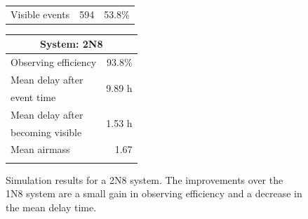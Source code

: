 \begin{colsection}
\begin{colsection}
\begin{figure}[p]
\begin{center}
\begin{minipage}[t]{0.45\textwidth}
\begin{tabular}{lrr}
                \midrule
                Visible events & 594 &  53.8\% \\
            \end{tabular}
        \end{minipage}
        \begin{minipage}[t]{0.37\textwidth}\vspace{0pt}
            \begin{tabular}{lr}
                \multicolumn{2}{c}{\textbf{System: 2N8}} \\
                \midrule
                Observing efficiency & 93.8\% \\
                \midrule
                Mean delay after     & \multirow{2}{*}{9.89 h} \\
                event time           & \\
                Mean delay after     & \multirow{2}{*}{1.53 h} \\
                becoming visible     & \\
                \midrule
                Mean airmass         & 1.67 \\
                & \\
            \end{tabular}
        \end{minipage}
    \end{center}
    \caption[GW simulation results: 2N8 system]{
        Simulation results for a 2N8 system. The improvements over the 1N8 system are a small gain in observing efficiency and a decrease in the mean delay time.
    }\label{fig:gw_sim_2n8}
\end{figure}

\newpage


\end{colsection}
\end{colsection}
